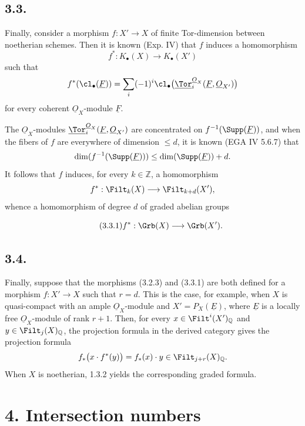 \subsection*{3.3.}
Finally, consider a morphism \(f:X'\to X\) of finite Tor-dimension between noetherian schemes. Then it is known (Exp. IV) that \(f\) induces a homomorphism
\[
 f^*:K_\bullet(X)\longrightarrow K_\bullet(X')
\]
such that
\[
 f^*(\cl_\bullet(\underline{F}))=
 \sum_i(-1)^i\cl_\bullet\bigl(\underline{\Tor}_i^{\underline{O}_X}(\underline{F},\underline{O}_{X'})\bigr)
\]
for every coherent \(\underline{O}_X\)-module \(\underline{F}\).

The \(\underline{O}_X\)-modules \(\underline{\Tor}_i^{\underline{O}_X}(\underline{F},\underline{O}_{X'})\) are concentrated on \(f^{-1}(\Supp(\underline{F}))\), and when the fibers of \(f\) are everywhere of dimension \(\leq d\), it is known (EGA IV 5.6.7) that
\[
 \dim(f^{-1}(\Supp(\underline{F})))\leq \dim(\Supp(\underline{F}))+d.
\]
It follows that \(f\) induces, for every \(k\in\mathbb Z\), a homomorphism
\[
 f^*:\Filt_k(X)\longrightarrow\Filt_{k+d}(X'),
\]
whence a homomorphism of degree \(d\) of graded abelian groups


%

\begin{equation}\tag{3.3.1}
 f^*:\Grb(X)\longrightarrow\Grb(X').
\end{equation}

\subsection*{3.4.}
Finally, suppose that the morphisms (3.2.3) and (3.3.1) are both defined for a morphism \(f:X'\to X\) such that \(r=d\). This is the case, for example, when \(X\) is quasi-compact with an ample \(\underline{O}_X\)-module and \(X'=P_X(\underline{E})\), where \(\underline{E}\) is a locally free \(\underline{O}_X\)-module of rank \(r+1\). Then, for every \(x\in\Filt^i(X')_{\mathbb Q}\) and \(y\in\Filt_j(X)_{\mathbb Q}\), the projection formula in the derived category gives the projection formula
\[
 f_*\bigl(x\cdot f^*(y)\bigr)=f_*(x)\cdot y\in\Filt_{j+r}(X)_{\mathbb Q}.
\]
When \(X\) is noetherian, 1.3.2 yields the corresponding graded formula.

\section*{4. Intersection numbers}

